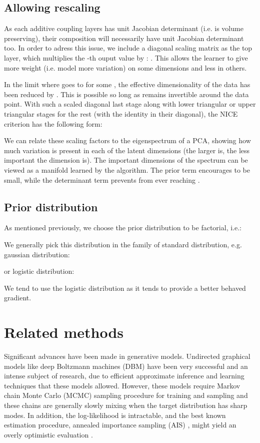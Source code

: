 \documentclass{article}
\begin{document}
\subsection{Allowing rescaling}
As each additive coupling layers has unit Jacobian determinant
(i.e. is volume preserving), their
composition will necessarily have unit Jacobian determinant too.
In order to adress this issue, we include
a diagonal scaling matrix  as the top layer, which multiplies the
-th ouput value by :
. This allows
the learner to give more weight (i.e. model more variation)
on some dimensions and less in others.

In the limit where  goes to  for some ,
the effective dimensionality of the data has been reduced by . This is possible so long as
 remains invertible around the data point. With such a scaled diagonal last stage along with lower triangular
or upper triangular stages for the rest (with the identity in their diagonal),
the NICE criterion has the following form:

We can relate these scaling factors to the eigenspectrum of a PCA, showing how much variation
is present in each of the latent dimensions
(the larger  is, the less important the dimension  is).  
The important dimensions of the spectrum can be viewed as a manifold learned by the algorithm. 
The prior term encourages  to be small, while the determinant
term  prevents  from ever reaching .

\subsection{Prior distribution}
As mentioned previously, we choose the prior distribution to be factorial,
i.e.:

We generally pick this distribution in the family of standard distribution,
e.g. gaussian distribution:

or logistic distribution:

We tend to use the logistic distribution as it tends to provide a better
behaved gradient.

\section{Related methods}


Significant advances have been made in generative models. Undirected
graphical models like deep Boltzmann machines (DBM) \citep{SalHinton09}
have been very successful and an intense subject of research, due to efficient approximate
inference and learning techniques that these models allowed. However, these
models require Markov chain Monte Carlo (MCMC) sampling procedure for training
and sampling and these chains are generally slowly mixing when the target
distribution has sharp modes. In addition, 
the log-likelihood is intractable, and the best known estimation procedure,
annealed importance sampling (AIS)
\citep{Salakhutdinov+Murray-2008}, might yield an overly optimistic
evaluation \citep{Grosse-et-al-ICML2013}.
\end{document}
